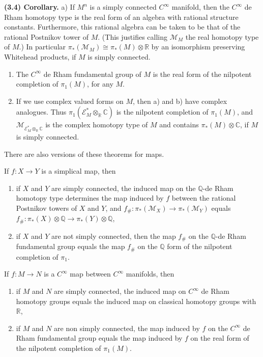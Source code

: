 \documentclass[
  english,
  a3paper,
  a3paper]{extarticle}
\begin{document}
\textbf{(3.4) Corollary.} a) If \(M^n\) is a simply connected
\(C^\infty\) manifold, then the \(C^\infty\) de Rham homotopy type is
the real form of an algebra with rational structure constants.
Furthermore, this rational algebra can be taken to be that of the
rational Postnikov tower of \(M\). (This justifies calling
\(\mathcal M_M\) the real homotopy type of \(M\).) In particular
\(\pi_*(\mathcal M_M)\cong\pi_*(M)\otimes\mathbb R\) by an isomorphism
preserving Whitehead products, if \(M\) is simply connected.

\begin{enumerate}
\def\labelenumi{\alph{enumi})}
\setcounter{enumi}{1}
\item
  The \(C^\infty\) de Rham fundamental group of \(M\) is the real form
  of the nilpotent completion of \(\pi_1(M)\), for any \(M\).
\item
  If we use complex valued forms on \(M\), then a) and b) have complex
  analogues. Thus \(\pi_1(\mathcal E_M^*\otimes_{\mathbb R}\mathbb C)\)
  is the nilpotent completion of \(\pi_1(M)\), and
  \(\mathcal M_{\mathcal E_M^*\otimes_{\mathbb R}\mathbb C}\) is the
  complex homotopy type of \(M\) and contains
  \(\pi_*(M)\otimes\mathbb C\), if \(M\) is simply connected.
\end{enumerate}

There are also versions of these theorems for maps.

If \(f:X\to Y\) is a simplical map, then

\begin{enumerate}
\def\labelenumi{\arabic{enumi})}
\item
  if \(X\) and \(Y\) are simply connected, the induced map on the
  \(\mathbb Q\)-de Rham homotopy type determines the map induced by
  \(f\) between the rational Postnikov towers of \(X\) and \(Y\), and
  \(f_\#: \pi_*(\mathcal M_X)\to\pi_*(\mathcal M_Y)\) equals
  \(f_\#: \pi_*(X)\otimes\mathbb Q\to\pi_*(Y)\otimes\mathbb Q\),
\item
  if \(X\) and \(Y\) are not simply connected, then the map \(f_\#\) on
  the \(\mathbb Q\)-de Rham fundamental group equals the map \(f_\#\) on
  the \(\mathbb Q\) form of the nilpotent completion of \(\pi_1\).
\end{enumerate}

If \(f:M\to N\) is a \(C^\infty\) map between \(C^\infty\) manifolds,
then

\begin{enumerate}
\def\labelenumi{\arabic{enumi})}
\item
  if \(M\) and \(N\) are simply connected, the induced map on
  \(C^\infty\) de Rham homotopy groups equals the induced map on
  classical homotopy groups with \(\mathbb R\),
\item
  if \(M\) and \(N\) are non simply connected, the map induced by \(f\)
  on the \(C^\infty\) de Rham fundamental group equals the map induced
  by \(f\) on the real form of the nilpotent completion of \(\pi_1(M)\).
\end{enumerate}
\end{document}
